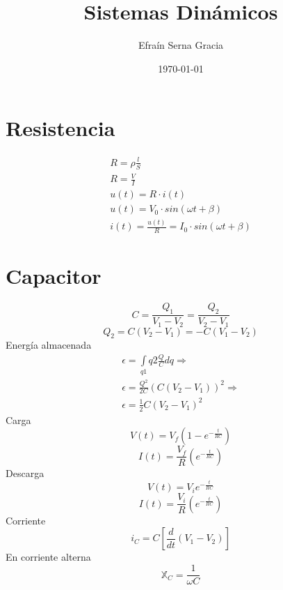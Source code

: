 \documentclass[12pt,spanish,lettersize,twocolumn]{article}
\title{\color{Maroon}Sistemas Din\'amicos}
\author{Efra\'in Serna Gracia}
\date{\color{gray}\today}
\begin{document}
\maketitle
\tableofcontents

\section{Resistencia}
\begin{eqnarray}
\nonumber R=\rho\frac{l}{S}\\
\nonumber R=\frac{V}{I}\\
\nonumber u(t)=R\cdot i(t)\\
\nonumber u(t)=V_0\cdot sin(\omega t+\beta)\\
\nonumber i(t)=\frac{u(t)}{R}=I_0\cdot sin(\omega t+\beta)
\end{eqnarray}

\section{Capacitor}
\begin{equation*}
C=\frac{Q_1}{V_1-V_2}=\frac{Q_2}{V_2-V_1}
\end{equation*}
\begin{equation*}
Q_2=C(V_2-V_1)=-C(V_1-V_2)
\end{equation*}
Energ\'ia almacenada
\begin{eqnarray}
\nonumber \epsilon=\int\limits_{q1}{q2}\frac{Q}{C}dq\Rightarrow\\
\nonumber \epsilon=\frac{Q^2}{2C}(C(V_2-V_1))^2\Rightarrow\\
\nonumber \epsilon=\frac{1}{2}C(V_2-V_1)^2
\end{eqnarray}
Carga
\begin{equation*}
V(t)=V_f(1-e^{-\frac{t}{RC}})
\end{equation*}
\begin{equation*}
I(t)=\frac{V_f}{R}(e^{-\frac{t}{RC}})
\end{equation*}
Descarga
\begin{equation*}
V(t)=V_ie^{-\frac{t}{RC}}
\end{equation*}
\begin{equation*}
I(t)=\frac{V_i}{R}(e^{-\frac{t}{RC}})
\end{equation*}
Corriente
\begin{equation*}
i_C=C\left[\frac{d}{dt}(V_1-V_2)\right]
\end{equation*}
En corriente alterna
\begin{equation*}
\mathbb{X}_C=\frac{1}{\omega C}
\end{equation*}
\end{document}

